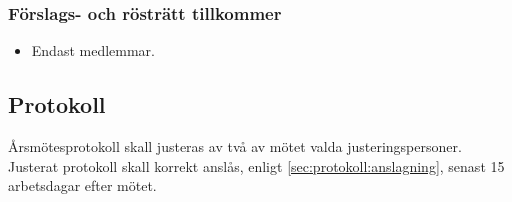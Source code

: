 \subsubsection{Förslags- och rösträtt tillkommer}  
\begin{itemize} 
	\item Endast medlemmar.
\end{itemize}

\subsection{Protokoll} 
Årsmötesprotokoll skall justeras av två av mötet valda justeringspersoner. Justerat protokoll skall korrekt anslås, enligt \ref{sec:protokoll:anslagning}, senast 15 arbetsdagar efter mötet.
